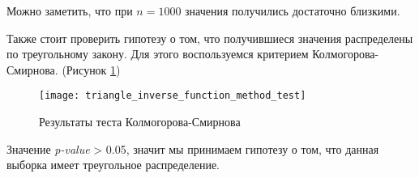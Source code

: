 Можно заметить, что при $n = 1000$ значения получились достаточно близкими.

\newpage

Также стоит проверить гипотезу о том, что получившиеся значения распределены по треугольному закону. Для этого воспользуемся критерием Колмогорова-Смирнова. (Рисунок \ref{fig:triangle_inverse_function_method_test})
\begin{figure}[h]
	\centering \texttt{[image: triangle\_inverse\_function\_method\_test]}
	\caption{Результаты теста Колмогорова-Смирнова}
	\label{fig:triangle_inverse_function_method_test}
\end{figure}

Значение \textit{p-value} > 0.05, значит мы принимаем гипотезу о том, что данная выборка имеет треугольное распределение.